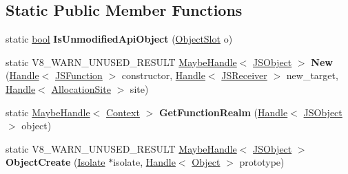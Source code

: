 \subsection*{Static Public Member Functions}
\begin{DoxyCompactItemize}
\item 
\mbox{\label{classv8_1_1internal_1_1JSObject_a4c18f7052941468f39fc83daca8b0edb}} 
static \mbox{\hyperlink{classbool}{bool}} {\bfseries Is\+Unmodified\+Api\+Object} (\mbox{\hyperlink{classv8_1_1internal_1_1ObjectSlot}{Object\+Slot}} o)
\item 
\mbox{\label{classv8_1_1internal_1_1JSObject_abde2263b904dde0d4bdbf09f36a2e2b9}} 
static V8\+\_\+\+W\+A\+R\+N\+\_\+\+U\+N\+U\+S\+E\+D\+\_\+\+R\+E\+S\+U\+LT \mbox{\hyperlink{classv8_1_1internal_1_1MaybeHandle}{Maybe\+Handle}}$<$ \mbox{\hyperlink{classv8_1_1internal_1_1JSObject}{J\+S\+Object}} $>$ {\bfseries New} (\mbox{\hyperlink{classv8_1_1internal_1_1Handle}{Handle}}$<$ \mbox{\hyperlink{classv8_1_1internal_1_1JSFunction}{J\+S\+Function}} $>$ constructor, \mbox{\hyperlink{classv8_1_1internal_1_1Handle}{Handle}}$<$ \mbox{\hyperlink{classv8_1_1internal_1_1JSReceiver}{J\+S\+Receiver}} $>$ new\+\_\+target, \mbox{\hyperlink{classv8_1_1internal_1_1Handle}{Handle}}$<$ \mbox{\hyperlink{classv8_1_1internal_1_1AllocationSite}{Allocation\+Site}} $>$ site)
\item 
\mbox{\label{classv8_1_1internal_1_1JSObject_a9068f77d5af0e07900cdf7fee2810880}} 
static \mbox{\hyperlink{classv8_1_1internal_1_1MaybeHandle}{Maybe\+Handle}}$<$ \mbox{\hyperlink{classv8_1_1internal_1_1Context}{Context}} $>$ {\bfseries Get\+Function\+Realm} (\mbox{\hyperlink{classv8_1_1internal_1_1Handle}{Handle}}$<$ \mbox{\hyperlink{classv8_1_1internal_1_1JSObject}{J\+S\+Object}} $>$ object)
\item 
\mbox{\label{classv8_1_1internal_1_1JSObject_afc2b37e53eabed33def8cbdbaa571ad2}} 
static V8\+\_\+\+W\+A\+R\+N\+\_\+\+U\+N\+U\+S\+E\+D\+\_\+\+R\+E\+S\+U\+LT \mbox{\hyperlink{classv8_1_1internal_1_1MaybeHandle}{Maybe\+Handle}}$<$ \mbox{\hyperlink{classv8_1_1internal_1_1JSObject}{J\+S\+Object}} $>$ {\bfseries Object\+Create} (\mbox{\hyperlink{classv8_1_1internal_1_1Isolate}{Isolate}} $\ast$isolate, \mbox{\hyperlink{classv8_1_1internal_1_1Handle}{Handle}}$<$ \mbox{\hyperlink{classv8_1_1internal_1_1Object}{Object}} $>$ prototype)

\end{DoxyCompactItemize}
